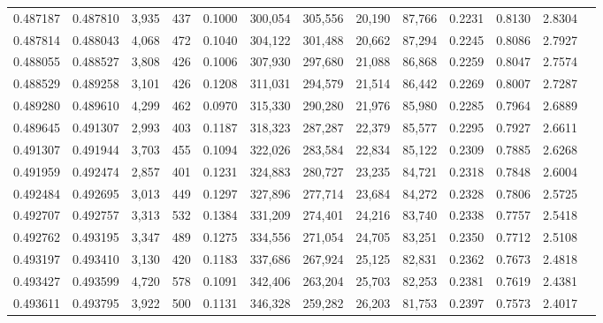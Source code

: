 \begin{tabular}{rrrrrrrrrrrrr}
0.487187 & 0.487810 &  3,935 &   437 &                                     0.1000 & 300,054 & 305,556 &  20,190 &  87,766 & 0.2231 & 0.8130 & 2.8304 \\
0.487814 & 0.488043 &  4,068 &   472 &                                     0.1040 & 304,122 & 301,488 &  20,662 &  87,294 & 0.2245 & 0.8086 & 2.7927 \\
0.488055 & 0.488527 &  3,808 &   426 &                                     0.1006 & 307,930 & 297,680 &  21,088 &  86,868 & 0.2259 & 0.8047 & 2.7574 \\
0.488529 & 0.489258 &  3,101 &   426 &                                     0.1208 & 311,031 & 294,579 &  21,514 &  86,442 & 0.2269 & 0.8007 & 2.7287 \\
0.489280 & 0.489610 &  4,299 &   462 &                                     0.0970 & 315,330 & 290,280 &  21,976 &  85,980 & 0.2285 & 0.7964 & 2.6889 \\
0.489645 & 0.491307 &  2,993 &   403 &                                     0.1187 & 318,323 & 287,287 &  22,379 &  85,577 & 0.2295 & 0.7927 & 2.6611 \\
0.491307 & 0.491944 &  3,703 &   455 &                                     0.1094 & 322,026 & 283,584 &  22,834 &  85,122 & 0.2309 & 0.7885 & 2.6268 \\
0.491959 & 0.492474 &  2,857 &   401 &                                     0.1231 & 324,883 & 280,727 &  23,235 &  84,721 & 0.2318 & 0.7848 & 2.6004 \\
0.492484 & 0.492695 &  3,013 &   449 &                                     0.1297 & 327,896 & 277,714 &  23,684 &  84,272 & 0.2328 & 0.7806 & 2.5725 \\
0.492707 & 0.492757 &  3,313 &   532 &                                     0.1384 & 331,209 & 274,401 &  24,216 &  83,740 & 0.2338 & 0.7757 & 2.5418 \\
0.492762 & 0.493195 &  3,347 &   489 &                                     0.1275 & 334,556 & 271,054 &  24,705 &  83,251 & 0.2350 & 0.7712 & 2.5108 \\
0.493197 & 0.493410 &  3,130 &   420 &                                     0.1183 & 337,686 & 267,924 &  25,125 &  82,831 & 0.2362 & 0.7673 & 2.4818 \\
0.493427 & 0.493599 &  4,720 &   578 &                                     0.1091 & 342,406 & 263,204 &  25,703 &  82,253 & 0.2381 & 0.7619 & 2.4381 \\
0.493611 & 0.493795 &  3,922 &   500 &                                     0.1131 & 346,328 & 259,282 &  26,203 &  81,753 & 0.2397 & 0.7573 & 2.4017 \\

\end{tabular}
